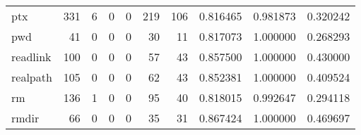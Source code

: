 \begin{longtable}{lrrrrrrrrr}
ptx       &                                       331 &                                                  6 &                                                  0 &                                                  0 &                                                219 &                                                106 &                                           0.816465 &                               0.981873 &                             0.320242 \\
pwd       &                                        41 &                                                  0 &                                                  0 &                                                  0 &                                                 30 &                                                 11 &                                           0.817073 &                               1.000000 &                             0.268293 \\
readlink  &                                       100 &                                                  0 &                                                  0 &                                                  0 &                                                 57 &                                                 43 &                                           0.857500 &                               1.000000 &                             0.430000 \\
realpath  &                                       105 &                                                  0 &                                                  0 &                                                  0 &                                                 62 &                                                 43 &                                           0.852381 &                               1.000000 &                             0.409524 \\
rm        &                                       136 &                                                  1 &                                                  0 &                                                  0 &                                                 95 &                                                 40 &                                           0.818015 &                               0.992647 &                             0.294118 \\
rmdir     &                                        66 &                                                  0 &                                                  0 &                                                  0 &                                                 35 &                                                 31 &                                           0.867424 &                               1.000000 &                             0.469697 \\

\end{longtable}
